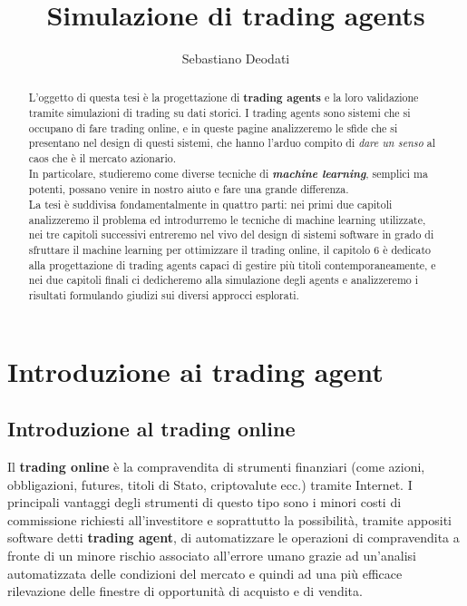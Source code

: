 \documentclass[binding=0.6cm]{sapthesis}
\title{Simulazione di trading agents}
\author{Sebastiano Deodati}
\begin{document}
	\frontmatter
	\maketitle
	\begin{abstract}
		L'oggetto di questa tesi è la progettazione di \textbf{trading agents} e la loro validazione tramite simulazioni di trading su dati storici. I trading agents sono sistemi che si occupano di fare
		trading online, e in queste pagine analizzeremo le sfide che si presentano nel design di questi sistemi, che hanno l'arduo compito di \textit{dare un senso} al caos che è il mercato azionario. \\
		In particolare, studieremo come diverse tecniche di \textbf{\textit{machine learning}}, semplici ma potenti, possano venire in nostro aiuto e fare una grande differenza. \\
		La tesi è suddivisa fondamentalmente in quattro parti: nei primi due capitoli analizzeremo il problema ed introdurremo le tecniche di machine learning utilizzate, nei tre capitoli successivi entreremo
		nel vivo del design di sistemi software in grado di sfruttare il machine learning per ottimizzare il trading online, il capitolo 6 è dedicato alla progettazione di trading agents capaci di gestire più
		titoli contemporaneamente, e nei due capitoli finali ci dedicheremo alla simulazione degli agents e analizzeremo i risultati formulando giudizi sui diversi approcci esplorati.
	\end{abstract}
	\tableofcontents
	\mainmatter
	\chapter{Introduzione ai trading agent}
		\section{Introduzione al trading online}
			Il \textbf{trading online} è la compravendita di strumenti finanziari (come azioni, obbligazioni, futures, titoli di Stato, criptovalute ecc.) tramite Internet. I principali vantaggi degli
			strumenti di questo tipo sono i minori costi di commissione richiesti all'investitore e soprattutto la possibilità, tramite appositi software detti \textbf{trading agent}, di automatizzare
			le operazioni di compravendita a fronte di un minore rischio associato all'errore umano grazie ad un'analisi automatizzata delle condizioni del mercato e quindi ad una più efficace
			rilevazione delle finestre di opportunità di acquisto e di vendita.
\end{document}

